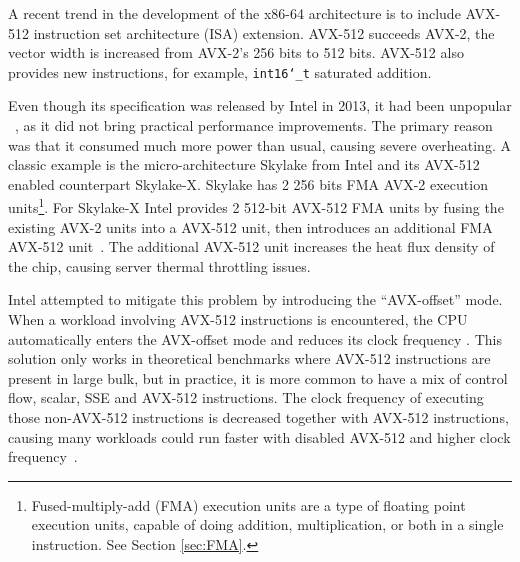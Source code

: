 \documentclass[logo,bsc,singlespacing,parskip]{infthesis}
\newcommand{\dtshort}{\texttt{int16\char`_t}}
\newcommand{\hlc}[2][yellow]{{%
    \colorlet{foo}{#1}%
    \sethlcolor{foo}\hl{#2}}%
}
\begin{document}
A recent trend in the development of the x86-64 architecture is to include AVX-512
instruction set architecture (ISA) extension. AVX-512 succeeds AVX-2, the vector
width is increased from AVX-2’s 256 bits to 512 bits. AVX-512 also provides new
instructions, for example, \dtshort{} saturated addition.


Even though its specification was released by Intel in 2013, it had been
unpopular ~\cite{linusHopeAvx512Die}, as it did not bring practical performance
improvements. The primary reason was that it consumed much more power than
usual, causing severe overheating. A classic example is the micro-architecture
Skylake from Intel and its AVX-512 enabled counterpart Skylake-X.
Skylake has 2 256 bits FMA AVX-2 execution
units\footnote{Fused-multiply-add (FMA) execution units are a type of floating
point execution units, capable of doing addition, multiplication, or both in a
single instruction. See Section \ref{sec:FMA}.}. For Skylake-X Intel provides 2
512-bit AVX-512 FMA units by fusing the existing AVX-2 units
into a AVX-512 unit, then introduces an additional FMA AVX-512
unit~\cite{SLK-X}. The additional AVX-512 unit increases the heat flux
density of the chip, causing server thermal throttling issues. 

Intel attempted to mitigate this problem by introducing the
``AVX-offset'' mode. When a workload involving AVX-512
instructions is encountered, the CPU automatically enters the
AVX-offset mode and reduces its clock frequency \cite{AVX-offset}. This
solution only works in theoretical benchmarks where AVX-512
instructions are present in large bulk, but in practice, it is more common to have a
mix of control flow, scalar, SSE and AVX-512 instructions. The
clock frequency of executing those non-AVX-512 instructions is
decreased together with AVX-512 instructions, causing many workloads
could run faster with disabled AVX-512 and higher clock
frequency~\cite{Zen4Critique}. 

\end{document}
